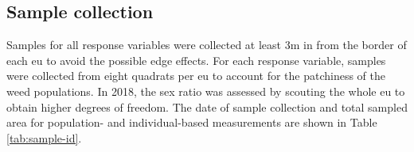 \documentclass[
]{article}
\begin{document}
\hypertarget{sample-collection}{%
\subsection*{Sample collection}\label{sample-collection}}

Samples for all response variables were collected at least 3m in from the border of each eu to avoid the possible edge effects.
For each response variable, samples were collected from eight quadrats per eu to account for the patchiness of the weed populations. In 2018, the sex ratio was assessed by scouting the whole eu to obtain higher degrees of freedom.
The date of sample collection and total sampled area for population- and individual-based measurements are shown in Table \ref{tab:sample-id}.
\end{document}
